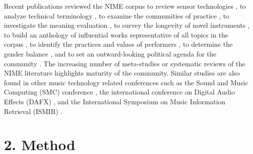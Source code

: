 \documentclass[sigconf]{nimeart}
\begin{document}
Recent publications reviewed the NIME corpus to review sensor technologies \cite{marshall_sensor_2009,medeiros_comprehensive_2014}, to analyze technical terminology \cite{jensenius_gesture_2014}, to examine the communities of practice \cite{marquez-borbon_fourteen_2015}, to investigate the meaning evaluation \cite{barbosa_what_2015}, to survey the longevity of novel instruments \cite{fmorreale2017}, to build an anthology of influential works representative of all topics in the corpus \cite{jensenius_nime_2017}, to identify the practices and values of performers \cite{morreale_nime_2018}, to determine the gender balance \cite{xambo_who_2018}, and to set an outward-looking political agenda for the community \cite{morreale_nime_2020}. The increasing number of meta-studies or systematic reviews of the NIME literature highlights maturity of the community. Similar studies are also found in other music technology related conferences such as the Sound and Music Computing (SMC) conference \cite{pratyshu_look_2010,mauro_sixteen_2020}, the international conference on Digital Audio Effects (DAFX) \cite{hamadicharef_bibliometric_2010,wilson_co-authorship_2017}, and the International Symposium on Music Information Retrieval (ISMIR) \cite{grachten_ismir_2009,lee_analysis_2009,sordo_analysis_2015,hu_wimir_2016}.

\section{2. Method}\label{method}
\end{document}
